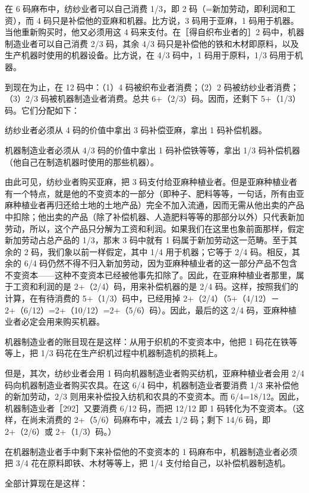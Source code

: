 在 6 码麻布中，纺纱业者可以自己消费 1/3，即 2 码（=新加劳动，即利润和工资），而 4 码只是补偿他的亚麻和机器。比方说，3 码用于亚麻，1 码用于机器。当他重新购买时，他又必须用这 4 码来支付。在［得自织布业者的］2 码中，机器制造业者可以自己消费 2/3 码，其余 4/3 码只是补偿他的铁和木材即原料，以及生产机器时使用的机器设备。比方说，在 4/3 码中，1 码用于原料，1/3 码用于机器。

到现在为止，在 12 码中：（1）4 码被织布业者消费；（2）2 码被纺纱业者消费；（3）2/3 码被机器制造业者消费。总共 6+（2/3）码。因而，还剩下 5+（1/3）码。它们分配如下：

纺纱业者必须从 4 码的价值中拿出 3 码补偿亚麻，拿出 1 码补偿机器。

机器制造业者必须从 4/3 码的价值中拿出 1 码补偿铁等等，拿出 1/3 码补偿机器（他自己在制造机器时使用的那些机器）。

由此可见，纺纱业者购买亚麻，把 3 码支付给亚麻种植业者。但是亚麻种植业者有一个特点，就是他的不变资本的一部分（即种子、肥料等等，一句话，所有由亚麻种植业者再归还给土地的土地产品）完全不加入流通，因而无需从他出卖的产品中扣除；他出卖的产品（除了补偿机器、人造肥料等等的那部分以外）只代表新加劳动，所以，这个产品只分解为工资和利润。如果我们在这里也象前面那样，假定新加劳动占总产品的 1/3，那末 3 码中就有 1 码属于新加劳动这一范畴。至于其余的 2 码，我们象以前一样假定，其中 1/4 用于机器；它等于 2/4 码。相反，其余的 6/4 码仍然不得不归入新加劳动，因为亚麻种植业者的这一部分产品不包含不变资本——这种不变资本已经被他事先扣除了。因此，在亚麻种植业者那里，属于工资和利润的是 2+（2/4）码，用来补偿机器的是 2/4 码。\fontbox{~\{}这样，按照我们的计算，在有待消费的 5+（1/3）码中，已经用掉 2+（2/4）（5+（4/12）－2+（6/12）=2+（10/12）=2+（5/6）码）。\fontbox{\}~}因此，最后的这 2/4 码，亚麻种植业者必定会用来购买机器。

机器制造业者的账目现在是这样：从用于织机的不变资本中，他把 1 码花在铁等等上，把 1/3 码花在生产织机过程中机器制造机的损耗上。

但是，其次，纺纱业者会用 1 码向机器制造业者购买纺机，亚麻种植业者会用 2/4 码向机器制造业者购买农具。在这 6/4 码中，机器制造业者要消费 1/3 来补偿他的新加劳动，2/3 则用来补偿投入纺机和农具的不变资本。而 6/4=18/12。因此，机器制造业者［292］又要消费 6/12 码，而把 12/12 即 1 码转化为不变资本。（这样，在尚未消费的 2+（5/6）码麻布中，减去 1/2 码；剩下 14/6 码，即 2+（2/6）或 2+（1/3）码。）

在机器制造业者手中剩下来补偿他的不变资本的 1 码麻布中，机器制造业者必须把 3/4 花在原料即铁、木材等等上，把 1/4 支付给自己，以补偿机器制造机。

全部计算现在是这样：

